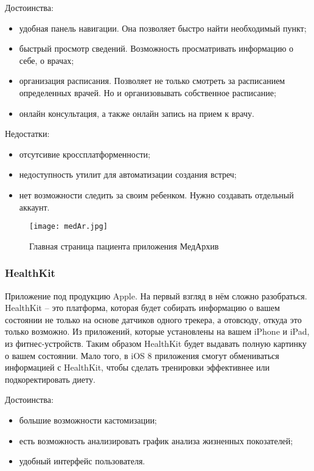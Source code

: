 Достоинства:
\begin{itemize}
  \item удобная панель навигации. Она позволяет быстро найти необходимый пункт;
  \item быстрый просмотр сведений. Возможность просматривать информацию о себе, о врачах;
  \item организация расписания. Позволяет не только смотреть за расписанием определенных врачей. Но и организовывать собственное расписание;
  \item онлайн консультация, а также онлайн запись на прием к врачу.
\end{itemize}

Недостатки:
\begin{itemize}
  \item отсутсивие кроссплатформенности;
  \item недоступность утилит для автоматизации создания встреч;
  \item нет возможности следить за своим ребенком. Нужно создавать отдельный аккаунт.
\end{itemize}
\begin{figure}[ht]
\centering
  \texttt{[image: medAr.jpg]}  
  \caption{ Главная страница пациента приложения МедАрхив }
  \label{fig:domain:manual_structure:credit_med}
\end{figure}

\subsubsection{HealthKit}

Приложение под продукцию Apple. На первый взгляд в нём сложно разобраться. HealthKit -- это платформа, которая будет собирать информацию о вашем состоянии не только на основе датчиков одного трекера, а отовсюду, откуда это только возможно. Из приложений, которые установлены на вашем iPhone и iPad, из фитнес-устройств. Таким образом HealthKit будет выдавать полную картинку о вашем состоянии. Мало того, в iOS 8 приложения смогут обмениваться информацией с HealthKit, чтобы сделать тренировки эффективнее или подкоректировать диету.

Достоинства:
\begin{itemize}
  \item большие возможности кастомизации;
  \item есть возможность анализировать график анализа жизненных покозателей;
  \item удобный интерфейс пользователя.
\end{itemize}

